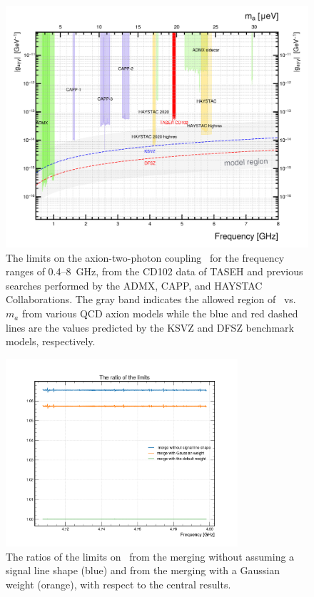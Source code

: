 \begin{figure} [htbp]
  \centering
 \includegraphics[width=12.9cm]{figures/RealData_limit_allexp.png}
  \caption{The limits on the axion-two-photon coupling \gagg\ for the 
frequency ranges of 0.4--8~GHz, from the CD102 data of TASEH and previous 
searches performed by the ADMX, CAPP, and HAYSTAC Collaborations. The gray 
band indicates the allowed region of \gagg\ vs. $m_a$ from various QCD axion 
models while the blue and red dashed lines are the values predicted by the 
KSVZ and DFSZ benchmark models, respectively.}
  \label{fig:gaggall}
\end{figure}


\begin{figure} [htbp]
  \centering
 \includegraphics[width=8.6cm]{figures/limitratio_weights.png}
  \caption{The ratios of the limits on \gagg\ from the merging without 
 assuming a signal line shape (blue) and from the merging with a 
 Gaussian weight (orange), with respect to the central results.}
  \label{fig:limitratio}
\end{figure}
